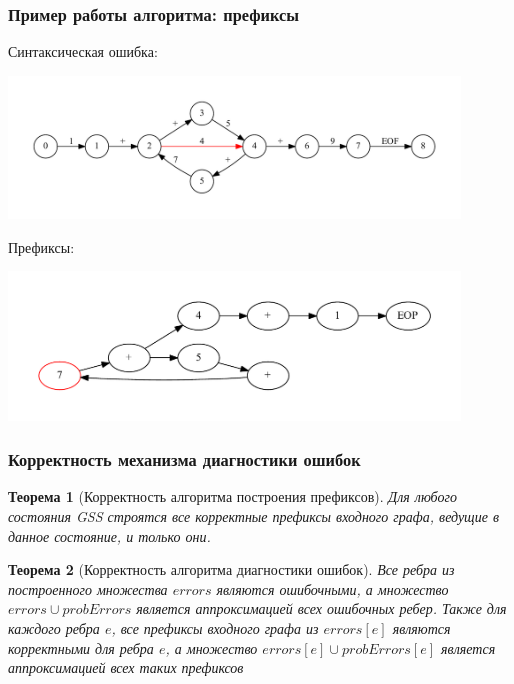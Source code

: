 \documentclass{beamer}
\newtheorem{rutheorem}{Теорема}
\begin{document}
\begin{frame}[fragile]
	\transwipe[direction=90]
	\frametitle{Пример работы алгоритма: префиксы}
	Синтаксическая ошибка:
	
	\includegraphics[width=340pt]{pictures/NumErrorFull.pdf}
	
	Префиксы:
	
    \includegraphics[width=340pt]{pictures/num4error.pdf}
    
\end{frame}

\begin{frame}[fragile]
  \transwipe[direction=90]
  \frametitle{Корректность механизма диагностики ошибок}
  \begin{rutheorem}[Корректность алгоритма построения префиксов]
    Для любого состояния GSS строятся все корректные префиксы входного графа, ведущие в данное состояние, и только они.
  \end{rutheorem}

  \begin{rutheorem}[Корректность алгоритма диагностики ошибок]
   Все ребра из построенного множества $errors$ являются ошибочными, а множество $errors \cup probErrors$ является аппроксимацией всех ошибочных ребер. Также для каждого ребра $e$, все префиксы входного графа из $errors[e]$ являются корректными для ребра $e$, а множество $errors[e] \cup probErrors[e]$ является аппроксимацией всех таких префиксов
  \end{rutheorem}
  
\end{frame}

\end{document}
